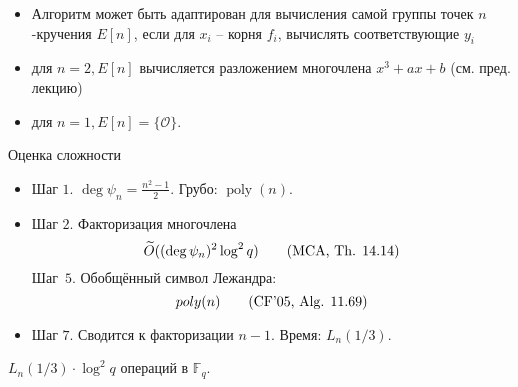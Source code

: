 \documentclass{beamer}
\begin{document}
\begin{frame}{}
    \begin{itemize}
        \item Алгоритм может быть адаптирован для вычисления самой группы точек $n$-кручения $E[ n]$, если для ${x_i}$ -- корня ${f_i}$, вычислять соответствующие ${y_i}$
        \item для $n = 2, E[n]$ вычисляется разложением многочлена ${x^3} + a x + b$ (см.  пред. лекцию)
        \item для $n = 1, E[n] = \{ \mathcal{O} \}$. 
    \end{itemize}
\end{frame}

\begin{frame}{Оценка сложности}
    \begin{itemize}
        \item Шаг $1$. $\deg \psi_n = \frac{n^2 - 1}{2}$. Грубо: $\operatorname{poly}(n)$. \\
        \item Шаг $2$.
        Факторизация многочлена
       	\begin{equation}
       	\widetilde{O}((\deg{\psi_n})^2 \log^2{q}) 	
       	\tag{\text{MCA, Th. 14.14}}
       	\end{equation}
        Шаг~$5$. Обобщённый символ Лежандра:
        \begin{equation}
        	poly(n) 
        	\tag{\text{CF'05, Alg. 11.69}}
        \end{equation}
        \item Шаг $7$. Сводится к факторизации $n-1$. Время: $L_n(1/3)$.
    \end{itemize}
    $L_n({1/3}) \cdot\log^2{q}$ операций в $\mathbb{F}_q$.
\end{frame}

\end{document}
